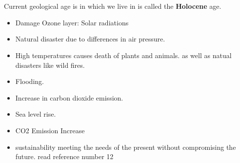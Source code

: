 \documentclass[11pt, a4paper]{article}
\begin{document}
\setcounter{page}{1}

\tableofcontents
\newpage
{}
\setcounter{page}{1}
\section{}
Current geological age is in which we live in is called  the \textbf{Holocene} age.

\begin{itemize}
  \item Damage Ozone layer: Solar radiations
  \item Natural disaster due to differences in air pressure.
  \item High temperatures causes death of plants and animals. as well as natual disasters like
        wild fires.
  \item Flooding.
  \item Increase in carbon dioxide emission.
  \item Sea level rise.
  \item CO2 Emission Increase
  \item sustainability meeting the needs of the present without compromising the future.
        read reference number 12
\end{itemize}
\end{document}
